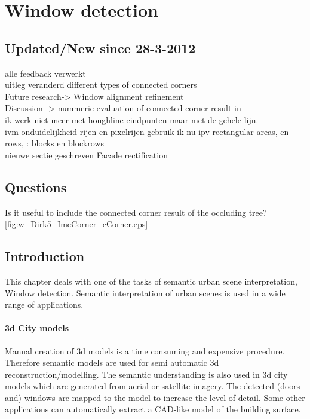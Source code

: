 







\section{Window detection}
\subsection{Updated/New since 28-3-2012}
alle feedback verwerkt\\
uitleg veranderd different types of connected corners\\
Future research-> Window alignment refinement\\
Discussion -> nummeric evaluation of connected corner result in \\
ik werk niet meer met houghline eindpunten maar met de gehele lijn.\\
ivm onduidelijkheid rijen en pixelrijen gebruik ik nu ipv rectangular areas, en rows, : blocks en blockrows\\
nieuwe sectie geschreven Facade rectification

\subsection{Questions}
Is it useful to include the connected corner result of the occluding tree?
\ref{fig:w_Dirk5_ImcCorner_cCorner.eps}

\label{chap:windowDetection}
\subsection{Introduction}
This chapter deals with one of the tasks of semantic urban scene interpretation, Window detection. 
Semantic interpretation of urban scenes is used in a wide range of applications.

\paragraph{3d City models} 
	Manual creation of 3d models is a time consuming and expensive procedure.
	Therefore semantic models are used for semi automatic 3d
	reconstruction/modelling.
	The semantic understanding is also used in 3d city models which are
	generated from aerial or satellite imagery.  The detected (doors and)
	windows are mapped to the model to increase the level of detail. 
	Some other applications can automatically extract a CAD-like model of
	the building surface.

